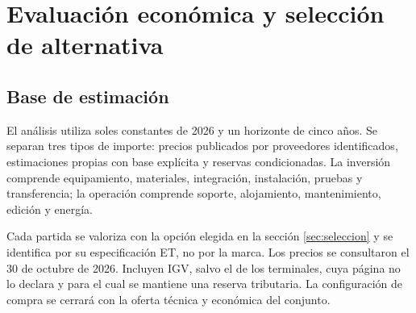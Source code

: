 \section{Evaluación económica y selección de alternativa}
\subsection{Base de estimación}
El análisis utiliza soles constantes de 2026 y un horizonte de cinco años. Se separan tres tipos de importe: precios publicados por proveedores identificados, estimaciones propias con base explícita y reservas condicionadas. La inversión comprende equipamiento, materiales, integración, instalación, pruebas y transferencia; la operación comprende soporte, alojamiento, mantenimiento, edición y energía.

Cada partida se valoriza con la opción elegida en la sección \ref{sec:seleccion} y se identifica por su especificación ET, no por la marca. Los precios se consultaron el 30 de octubre de 2026. Incluyen IGV, salvo el de los terminales, cuya página no lo declara y para el cual se mantiene una reserva tributaria. La configuración de compra se cerrará con la oferta técnica y económica del conjunto.

